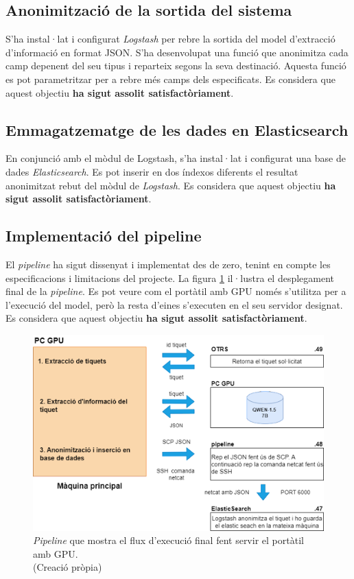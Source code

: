 \subsection{Anonimització de la sortida del sistema}
S'ha instal·lat i configurat \textit{Logstash} per rebre la sortida del model d'extracció d'informació en format JSON. S'ha desenvolupat una funció que anonimitza cada camp depenent del seu tipus i reparteix segons la seva destinació. Aquesta funció es pot parametritzar per a rebre més camps dels especificats. Es considera que aquest objectiu \textbf{ha sigut assolit satisfactòriament}.

\subsection{Emmagatzematge de les dades en Elasticsearch}
En conjunció amb el mòdul de Logstash, s'ha instal·lat i configurat una base de dades \textit{Elasticsearch}. Es pot inserir en dos índexos diferents el resultat anonimitzat rebut del mòdul de \textit{Logstash}. Es considera que aquest objectiu \textbf{ha sigut assolit satisfactòriament}.

\subsection{Implementació del pipeline}
El \textit{pipeline} ha sigut dissenyat i implementat des de zero, tenint en compte les especificacions i limitacions del projecte. La figura \ref{fig:pipeline_flux_real} il·lustra el desplegament final de la \textit{pipeline}. Es pot veure com el portàtil amb GPU només s'utilitza per a l'execució del model, però la resta d'eines s'executen en el seu servidor designat. Es considera que aquest objectiu \textbf{ha sigut assolit satisfactòriament}.

\begin{figure}[H]
\centering
\includegraphics[width=\textwidth]{pipeline_flux_real.png}
\caption[\textit{Pipeline} mostra el flux d'execució final]{\textit{Pipeline} que mostra el flux d'execució final fent servir el portàtil amb GPU. \\ (Creació pròpia)}
\label{fig:pipeline_flux_real}
\end{figure}

